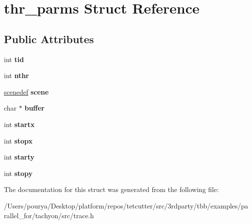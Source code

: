 \hypertarget{structthr__parms}{}\section{thr\+\_\+parms Struct Reference}
\label{structthr__parms}
\subsection*{Public Attributes}
\begin{DoxyCompactItemize}
\item 
\hypertarget{structthr__parms_a54cc94e60820a0cf4a861c9a6bfba1c9}{}int {\bfseries tid}\label{structthr__parms_a54cc94e60820a0cf4a861c9a6bfba1c9}

\item 
\hypertarget{structthr__parms_ad686fa568f5cc1e52c05fcaf2cedf96d}{}int {\bfseries nthr}\label{structthr__parms_ad686fa568f5cc1e52c05fcaf2cedf96d}

\item 
\hypertarget{structthr__parms_a9abc1d7c0220c5c77a7cfb6f6efa2091}{}\hyperlink{structscenedef}{scenedef} {\bfseries scene}\label{structthr__parms_a9abc1d7c0220c5c77a7cfb6f6efa2091}

\item 
\hypertarget{structthr__parms_a5c772efd9e719e80f328d2ccf8566018}{}char $\ast$ {\bfseries buffer}\label{structthr__parms_a5c772efd9e719e80f328d2ccf8566018}

\item 
\hypertarget{structthr__parms_a05bf73ed8dc31d12d148f1ceb9b705fd}{}int {\bfseries startx}\label{structthr__parms_a05bf73ed8dc31d12d148f1ceb9b705fd}

\item 
\hypertarget{structthr__parms_a7c052f16323ba7550b5f2a3ccd62f947}{}int {\bfseries stopx}\label{structthr__parms_a7c052f16323ba7550b5f2a3ccd62f947}

\item 
\hypertarget{structthr__parms_ab310bea64548416dea284bc173c1c0bf}{}int {\bfseries starty}\label{structthr__parms_ab310bea64548416dea284bc173c1c0bf}

\item 
\hypertarget{structthr__parms_a8071e19dfe5aa83091d8529e1f9a6c08}{}int {\bfseries stopy}\label{structthr__parms_a8071e19dfe5aa83091d8529e1f9a6c08}

\end{DoxyCompactItemize}


The documentation for this struct was generated from the following file\+:\begin{DoxyCompactItemize}
\item 
/\+Users/pourya/\+Desktop/platform/repos/tetcutter/src/3rdparty/tbb/examples/parallel\+\_\+for/tachyon/src/trace.\+h\end{DoxyCompactItemize}
